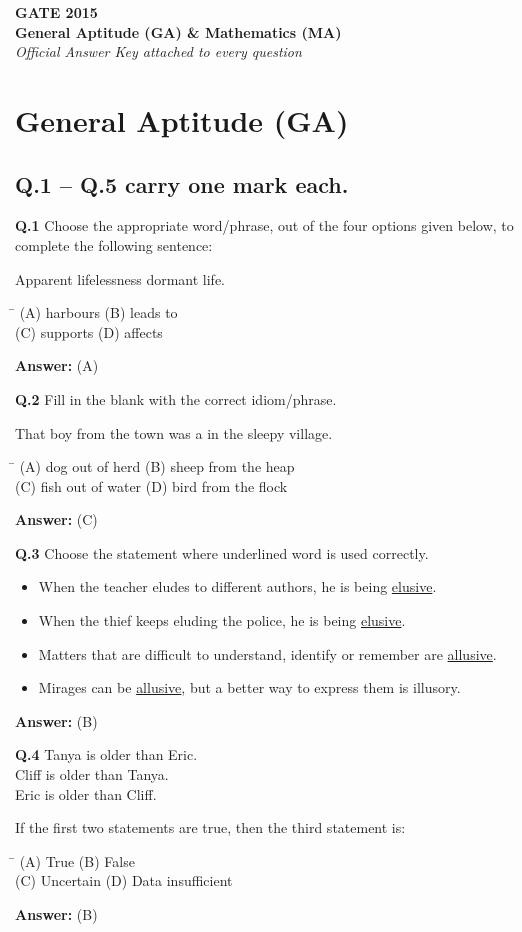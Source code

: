 \documentclass[11pt,a4paper]{article}
\newcommand{\optsfourA}[4]{%
  \begin{tabbing}
    \hspace{0.48\linewidth}\=\kill
    (A) #1 \> (B) #2 \\[2pt]
    (C) #3 \> (D) #4
  \end{tabbing}%
}
\newcommand{\optslistA}[4]{%
  \begin{itemize}
    \setlength{\itemsep}{2pt}\setlength{\parskip}{0pt}
    \item[(A)] #1
    \item[(B)] #2
    \item[(C)] #3
    \item[(D)] #4
  \end{itemize}%
}
\newcommand{\ans}[1]{\textbf{Answer:} #1\par\medskip}
\begin{document}

\begin{center}
  {\LARGE\bfseries GATE 2015}\\[4pt]
  {\large\bfseries General Aptitude (GA) \& Mathematics (MA)}\\[2pt]
  {\small\itshape Official Answer Key attached to every question}
\end{center}
\medskip

\section*{General Aptitude (GA)}

\subsection*{Q.1 -- Q.5 carry one mark each.}

\textbf{Q.1} Choose the appropriate word/phrase, out of the four options given below, to complete the following sentence:

Apparent lifelessness \underline{\hspace{2.5cm}} dormant life.
\optsfourA{harbours}{leads to}{supports}{affects}
\ans{(A)}

\textbf{Q.2} Fill in the blank with the correct idiom/phrase.

That boy from the town was a \underline{\hspace{2.5cm}} in the sleepy village.
\optsfourA{dog out of herd}{sheep from the heap}{fish out of water}{bird from the flock}
\ans{(C)}

\textbf{Q.3} Choose the statement where underlined word is used correctly.
\optslistA{When the teacher eludes to different authors, he is being \underline{elusive}.}{When the thief keeps eluding the police, he is being \underline{elusive}.}{Matters that are difficult to understand, identify or remember are \underline{allusive}.}{Mirages can be \underline{allusive}, but a better way to express them is illusory.}
\ans{(B)}

\textbf{Q.4} Tanya is older than Eric.\\
Cliff is older than Tanya.\\
Eric is older than Cliff.

If the first two statements are true, then the third statement is:
\optsfourA{True}{False}{Uncertain}{Data insufficient}
\ans{(B)}
\end{document}

